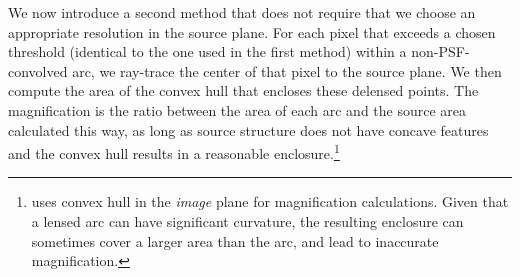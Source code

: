 We now introduce a second method that does not require that we choose an appropriate resolution in the source plane.
For each pixel that exceeds a chosen threshold (identical to the one used in the first method) within a non-PSF-convolved arc, we ray-trace the center of that pixel to the source plane.
We then compute the area of the convex hull that encloses these delensed points.  
The magnification is the ratio between the area of each arc and the source area calculated this way,
as long as source structure does not have concave features and the convex hull results in a reasonable enclosure.\footnote{\citet{zhang2023a} uses convex hull in the \emph{image} plane for magnification calculations.
Given that a lensed arc can have significant curvature, the resulting enclosure can sometimes cover a larger area than the arc, and lead to inaccurate magnification.}  









